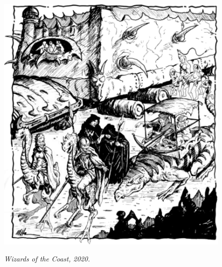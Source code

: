 \clearpage
\begin{figure}[t!]
\centering
\includegraphics[width=\columnwidth]{images/caravan-3.png}
\par\textit{\small\textcopyright Wizards of the Coast, 2020.}
\end{figure}

